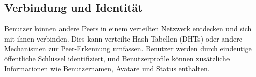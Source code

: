 \subsection{Verbindung und Identität}

Benutzer können andere Peers in einem verteilten Netzwerk entdecken und sich mit ihnen 
verbinden. Dies kann verteilte Hash-Tabellen (DHTs) oder andere Mechanismen zur 
Peer-Erkennung umfassen.
Benutzer werden durch eindeutige öffentliche Schlüssel identifiziert, und Benutzerprofile 
können zusätzliche Informationen wie Benutzernamen, Avatare und Status enthalten.